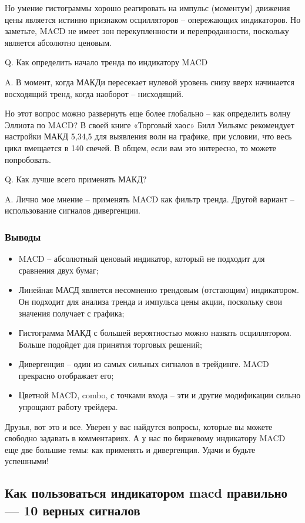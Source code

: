 \documentclass[a5paper]{article}
\begin{document}
Но умение гистограммы хорошо реагировать на импульс (моментум) движения цены является истинно признаком осцилляторов – опережающих индикаторов. Но заметьте, MACD не имеет зон перекупленности и перепроданности, поскольку является абсолютно ценовым.

Q. Как определить начало тренда по индикатору MACD

A. В момент, когда МАКДи пересекает нулевой уровень снизу вверх начинается восходящий тренд, когда наоборот – нисходящий.

Но этот вопрос можно развернуть еще более глобально – как определить волну Эллиота по MACD? В своей книге «Торговый хаос» Билл Уильямс рекомендует настройки МАКД 5,34,5 для выявления волн на графике, при условии, что весь цикл вмещается в 140 свечей. В общем, если вам это интересно, то можете попробовать.

Q. Как лучше всего применять МАКД?

A. Лично мое мнение – применять MACD как фильтр тренда. Другой вариант
– использование сигналов дивергенции.

\subsubsection{Выводы}
\begin{itemize}
\item     MACD – абсолютный ценовый индикатор, который не подходит для сравнения двух бумаг;
\item     Линейная МАСД является несомненно трендовым (отстающим) индикатором. Он подходит для анализа тренда и импульса цены акции, поскольку свои значения получает с графика;
\item     Гистограмма МАКД с большей вероятностью можно назвать осциллятором. Больше подойдет для принятия торговых решений;
\item     Дивергенция – один из самых сильных сигналов в трейдинге. MACD прекрасно отображает его;
\item     Цветной MACD, combo, с точками входа – эти и другие модификации сильно упрощают работу трейдера.
\end{itemize}

Друзья, вот это и все. Уверен у вас найдутся вопросы, которые вы
можете свободно задавать в комментариях. А у нас по биржевому
индикатору MACD еще две большие темы: как применять и
дивергенция. Удачи и будьте успешными!

\subsection{Как пользоваться индикатором macd правильно — 10 верных
  сигналов}
\end{document}
